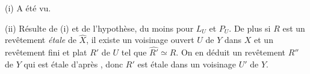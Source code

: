 (i) A \'et\'e vu.

(ii) R\'esulte de (i) et de l'hypoth\`ese, du moins pour $L_U$ et $P_U$. De plus si $R$ est un rev\^etement \emph{\'etale} de $\hat{X}$, il existe un voisinage ouvert $U$ de $Y$ dans $X$ et un rev\^etement fini et plat $R'$ de $U$ tel que $\widehat{R'} \simeq R$. On en d\'eduit un rev\^etement $R''$ de $Y$ qui est \'etale d'apr\`es , donc $R'$ est \'etale dans un voisinage $U'$ de $Y$. \cqfd
